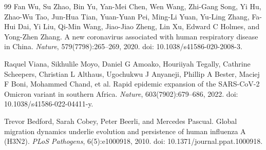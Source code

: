 \documentclass[12pt]{article}
\theoremstyle{definition}
\theoremstyle{plain}
\begin{document}
\begin{thebibliography}{99}
 Fan Wu, Su Zhao, Bin Yu, Yan-Mei Chen, Wen Wang, Zhi-Gang
Song, Yi Hu, Zhao-Wu Tao, Jun-Hua Tian, Yuan-Yuan Pei, Ming-Li Yuan, Yu-Ling
Zhang, Fa-Hui Dai, Yi Liu, Qi-Min Wang, Jiao-Jiao Zheng, Lin Xu, Edward C
Holmes, and Yong-Zhen Zhang. A new coronavirus associated with human
respiratory disease in China. \emph{Nature}, 579(7798):265--269, 2020. doi:
10.1038/s41586-020-2008-3.

 Raquel Viana, Sikhulile Moyo, Daniel G Amoako, Houriiyah
Tegally, Cathrine Scheepers, Christian L Althaus, Ugochukwu J Anyaneji,
Phillip A Bester, Maciej F Boni, Mohammed Chand, et al. Rapid epidemic
expansion of the SARS-CoV-2 Omicron variant in southern Africa.
\emph{Nature}, 603(7902):679--686, 2022. doi: 10.1038/s41586-022-04411-y.

 Trevor Bedford, Sarah Cobey, Peter Beerli, and Mercedes
Pascual. Global migration dynamics underlie evolution and persistence of
human influenza A (H3N2). \emph{PLoS Pathogens}, 6(5):e1000918, 2010. doi:
10.1371/journal.ppat.1000918.

\end{thebibliography}
\end{document}
